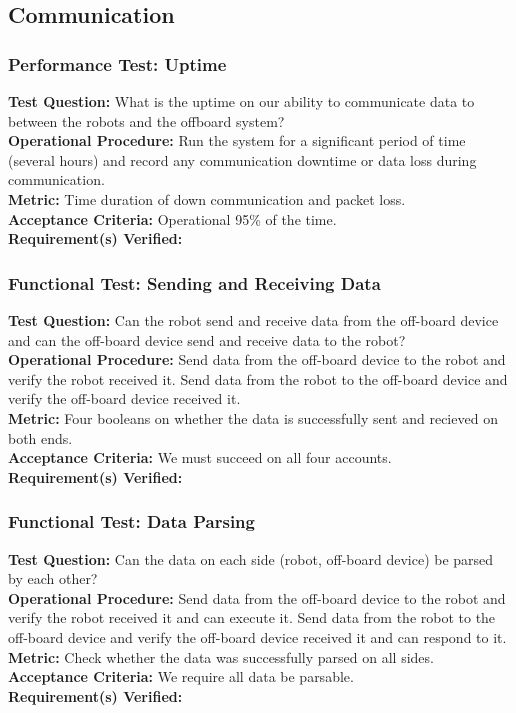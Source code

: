 
\subsection{Communication}
\label{sec:verification_comm}


\subsubsection{Performance Test: Uptime}
\label{sec:comm_pt_reliability}
\textbf{Test Question:} What is the uptime on our ability to communicate data to between the robots and the offboard system?  \\
\textbf{Operational Procedure:} Run the system for a significant period of time (several hours) and record any communication downtime or data loss during communication. \\
\textbf{Metric:} Time duration of down communication and packet loss. \\
\textbf{Acceptance Criteria:} Operational 95\% of the time.\\
\textbf{Requirement(s) Verified:} 

\subsubsection{Functional Test: Sending and Receiving Data}
\label{sec:comm_ft_send}
\textbf{Test Question:} Can the robot send and receive data from the off-board device and can the off-board device send and receive data to the robot?\\
\textbf{Operational Procedure:} Send data from the off-board device to the robot and verify the robot received it. Send data from the robot to the off-board device and verify the off-board device received it. \\
\textbf{Metric:} Four booleans on whether the data is successfully sent and recieved on both ends. \\
\textbf{Acceptance Criteria:} We must succeed on all four accounts. \\
\textbf{Requirement(s) Verified:} 

\subsubsection{Functional Test: Data Parsing}
\label{sec:comm_ft_parse}
\textbf{Test Question:}  Can the data on each side (robot, off-board device) be parsed by each other? \\
\textbf{Operational Procedure:} Send data from the off-board device to the robot and verify the robot received it and can execute it. Send data from the robot to the off-board device and verify the off-board device received it and can respond to it. \\
\textbf{Metric:} Check whether the data was successfully parsed on all sides. \\
\textbf{Acceptance Criteria:} We require all data be parsable. \\
\textbf{Requirement(s) Verified:} 

